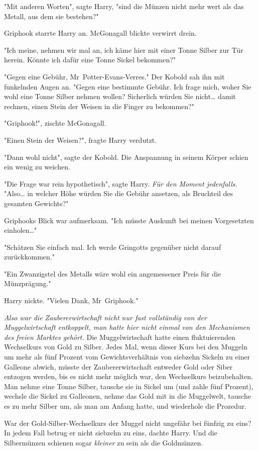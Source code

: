 {"Mit anderen Worten", sagte Harry, "sind die Münzen nicht mehr wert als das Metall, aus dem sie bestehen?"

Griphook starrte Harry an. McGonagall blickte verwirrt drein.

"Ich meine, nehmen wir mal an, ich käme hier mit einer Tonne Silber zur Tür herein. Könnte ich dafür eine Tonne Sickel bekommen?"

"Gegen eine Gebühr, Mr~Potter-Evans-Verres." Der Kobold sah ihn mit funkelnden Augen an. "Gegen eine bestimmte Gebühr. Ich frage mich, woher Sie wohl eine Tonne Silber nehmen wollen? Sicherlich würden Sie nicht… damit rechnen, einen Stein der Weisen in die Finger zu bekommen?"

"Griphook!", zischte McGonagall.

"Einen Stein der Weisen?", fragte Harry verdutzt.

"Dann wohl nicht", sagte der Kobold. Die Anspannung in seinem Körper schien ein wenig zu weichen.

"Die Frage war rein hypothetisch", sagte Harry. \emph{Für den Moment jedenfalls.} "Also… in welcher Höhe würden Sie die Gebühr ansetzen, als Bruchteil des gesamten Gewichts?"

Griphooks Blick war aufmerksam. "Ich müsste Auskunft bei meinen Vorgesetzten einholen…"

"Schätzen Sie einfach mal. Ich werde Gringotts gegenüber nicht darauf zurückkommen."

"Ein Zwanzigstel des Metalls wäre wohl ein angemessener Preis für die Münzprägung."

Harry nickte. "Vielen Dank, Mr~Griphook."

\emph{Also war die Zaubererwirtschaft nicht nur fast vollständig von der Muggelwirtschaft entkoppelt, man hatte hier nicht einmal von den Mechanismen des freien Marktes gehört.} Die Muggelwirtschaft hatte einen fluktuierenden Wechselkurs von Gold zu Silber. Jedes Mal, wenn dieser Kurs bei den Muggeln um mehr als fünf Prozent vom Gewichtsverhältnis von siebzehn Sickeln zu einer Galleone abwich, müsste der Zaubererwirtschaft entweder Gold oder Siber entzogen werden, bis es nicht mehr möglich war, den Wechselkurs beizubehalten. Man nehme eine Tonne Silber, tausche sie in Sickel um (und zahle fünf Prozent), wechsle die Sickel zu Galleonen, nehme das Gold mit in die Muggelwelt, tausche es zu mehr Silber um, als man am Anfang hatte, und wiederhole die Prozedur.

War der Gold-Silber-Wechselkurs der Muggel nicht ungefähr bei fünfzig zu eins? In jedem Fall betrug er nicht siebzehn zu eins, dachte Harry. Und die Silbermünzen schienen sogar \emph{kleiner} zu sein als die Goldmünzen.

}
